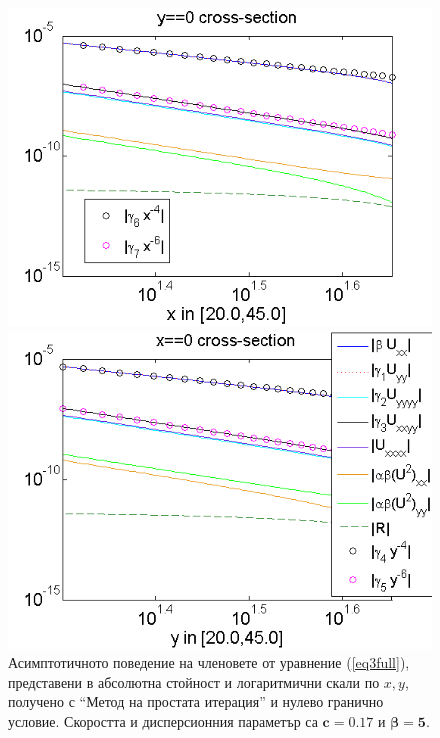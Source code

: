 \documentclass[a4paper]{article}
\newcommand{\rf}[1]{(\ref{#1})}
\theoremstyle{remark}
\begin{document}
\FloatBarrier
\begin{figure}[ht]
	\begin{minipage}[b]{0.95\linewidth}
		\raggedleft
		\includegraphics[width=\linewidth]{AssymptForEachTerm/c017_bt1_5/ChristovIC_AlongX_50_ZB2_bt5_c017_h020_O(h^6).png}
	\end{minipage}
	\begin{minipage}[b]{0.95\linewidth}
		 \raggedright
		\includegraphics[width=\linewidth]{AssymptForEachTerm/c017_bt1_5/ChristovIC_AlongY_50_ZB2_bt5_c017_h020_O(h^6).png}
	\end{minipage}
	\caption{Асимптотичното поведение на членовете от уравнение \rf{eq3full}, представени в абсолютна стойност и логаритмични скали по $x,y$, получено с ``Метод на простата итерация'' и нулево гранично условие. Скоростта и дисперсионния параметър са $\boldsymbol{c=0.17}$ и $\boldsymbol{\beta = 5}$.}
	\label{fig:assympt_c017bt5}
\end{figure}
\end{document}
